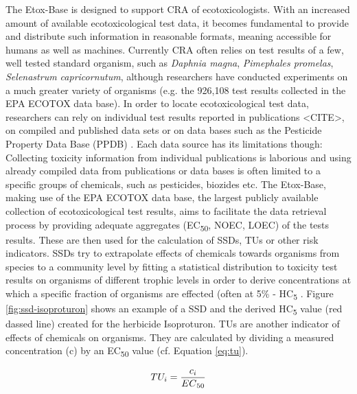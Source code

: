 \documentclass[english]{article}
\newcommand{\etoxbase}{Etox-Base}
\newcommand{\ecfifty}{EC\textsubscript{50}}
\begin{document}
The \etoxbase{} is designed to support CRA of ecotoxicologists. With an increased amount of available ecotoxicological test data, it becomes fundamental to provide and distribute such information in reasonable formats, meaning accessible for humans as well as machines. Currently CRA often relies on test results of a few, well tested standard organism, such as \textit{Daphnia magna}, \textit{Pimephales promelas}, \textit{Selenastrum capricornutum}, although researchers have conducted experiments on a much greater variety of organisms (e.g. the 926,108 test results collected in the EPA ECOTOX data base). In order to locate ecotoxicological test data, researchers can rely on individual test results reported in publications <CITE>, on compiled and published data sets \citep{malaj_organic_2014} or on data bases such as the Pesticide Property Data Base (PPDB) \citep{lewis_international_2016}. Each data source has its limitations though: Collecting toxicity information from individual publications is laborious and using already compiled data from publications or data bases is often limited to a specific groups of chemicals, such as pesticides, biozides etc. The \etoxbase{}, making use of the EPA ECOTOX data base, the largest publicly available collection of ecotoxicological test results, aims to facilitate the data retrieval process by providing adequate aggregates (\ecfifty{}, NOEC, LOEC) of the tests results. These are then used for the calculation of SSDs, TUs or other risk indicators. SSDs try to extrapolate effects of chemicals towards organisms from species to a community level by fitting a statistical distribution to toxicity test results on organisms of different trophic levels in order to derive concentrations at which a specific fraction of organisms are effected (often at 5\% - HC\textsubscript{5} \citep{posthuma_species_2002}. Figure \ref{fig:ssd-isoproturon} shows an example of a SSD and the derived HC\textsubscript{5} value (red dassed line) created for the herbicide Isoproturon. TUs are another indicator of effects of chemicals on organisms. They are calculated by dividing a measured concentration (c) by an \ecfifty{} value (cf. Equation \ref{eq:tu}).

\begin{equation}
    TU_i = \frac{c_i}{\ecfifty}
    \label{eq:tu}
\end{equation}
\end{document}
